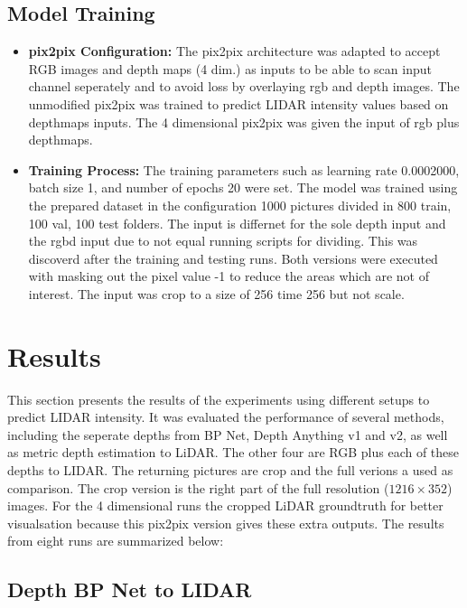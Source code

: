 \newpage
\subsection{Model Training}\label{modeltraining}
\begin{itemize}
	\item \textbf{pix2pix Configuration:} The pix2pix architecture was adapted to accept RGB images and depth maps (4 dim.) as inputs to be able to scan input channel seperately and to avoid loss by overlaying rgb and depth images. The unmodified pix2pix was trained to predict LIDAR intensity values based on depthmaps inputs. The 4 dimensional pix2pix was given the input of rgb plus depthmaps.
	\item \textbf{Training Process:} The training parameters such as learning rate 0.0002000, batch size 1, and number of epochs 20 were set. The model was trained using the prepared dataset in the configuration 1000 pictures divided in 800 train, 100 val, 100 test folders. The input is differnet for the sole depth input and the rgbd input due to not equal running scripts for dividing. This was discoverd after the training and testing runs. Both versions were executed with masking out the pixel value -1 to reduce the areas which are not of interest. The input was crop to a size of 256 time 256  but not scale.
\end{itemize}

\section{Results} \label{results}

This section presents the results of the  experiments using different setups to predict LIDAR intensity. It was  evaluated the performance of several methods, including the seperate depths from BP Net, Depth Anything v1 and v2, as well as metric depth estimation to LiDAR. The other four are RGB plus each of these depths to LIDAR. The returning pictures are crop and the full verions a used as comparison. The crop version is the right part of the full resolution ($1216 \times 352$) images. For the 4 dimensional runs the cropped LiDAR groundtruth for better visualsation because this pix2pix version gives these extra outputs. The results from eight runs are summarized below:
\subsection{Depth BP Net to LIDAR}

